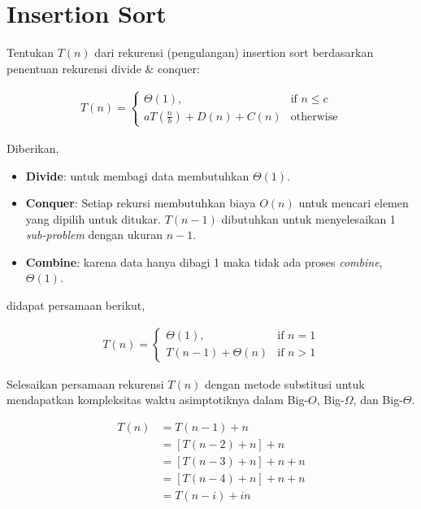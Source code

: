\section{Insertion Sort}

\Problem Tentukan $T(n)$ dari rekurensi (pengulangan) insertion sort berdasarkan penentuan rekurensi divide \& conquer:

\begin{align*}
    T(n) =
        \begin{cases}
            \Theta(1),                      & \text{if } n \leq c \\
            aT(\frac{n}{b}) + D(n) + C(n)   & \text{otherwise}
        \end{cases}
\end{align*}

\TheSolution
Diberikan,

\begin{itemize}
    \item \textbf{Divide}: untuk membagi data membutuhkan $\Theta(1)$.
    \item \textbf{Conquer}: Setiap rekursi membutuhkan biaya $O(n)$ untuk mencari elemen yang dipilih untuk ditukar. $T(n - 1)$ dibutuhkan untuk menyelesaikan 1 \textit{sub-problem} dengan ukuran $n - 1$.
    \item \textbf{Combine}: karena data hanya dibagi 1 maka tidak ada proses \textit{combine}, $\Theta(1)$.
\end{itemize}

didapat persamaan berikut,

\begin{align*}
    T(n) =
        \begin{cases}
            \Theta(1),              & \text{if } n = 1 \\
            T(n - 1) + \Theta(n)    & \text{if } n > 1                
        \end{cases}
\end{align*}

\Problem Selesaikan persamaan rekurensi $T(n)$ dengan metode substitusi untuk mendapatkan
kompleksitas waktu asimptotiknya dalam Big-$O$, Big-$\Omega$, dan Big-$\Theta$.

\TheSolution

\begin{align*}
    T(n) & = T(n - 1) + n \\
         & = [T(n - 2) + n] + n \\
         & = [T(n - 3) + n] + n + n \\
         & = [T(n - 4) + n] + n + n \\
         & = T(n - i) + in \\
\end{align*}

